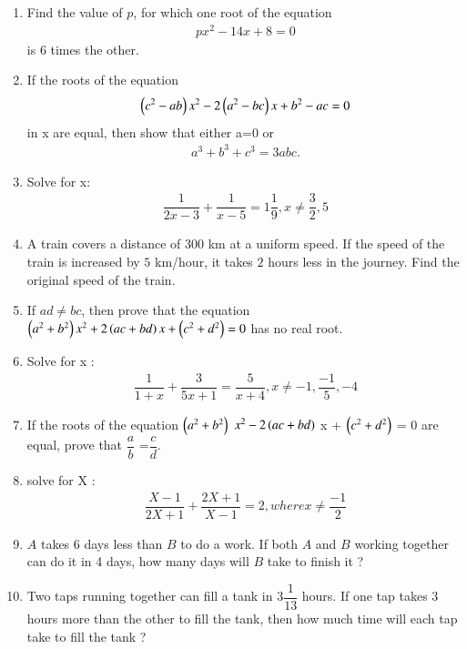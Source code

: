 \begin{enumerate}
\item Find the value of $p$, for which one root of the equation 
\begin{align*}
	px^2-14x+8=0
\end{align*}
is $6$ times the other.
\item If the roots of the equation
\begin{align*}
	\left(c^2-ab\right)x^2-2\left(a^2-bc\right)x+b^2-ac=0 
\end{align*}
in x are equal, then show that either a=0 or 
\begin{align*}
	a^3+b^3+c^3=3abc.
\end{align*}
\item Solve for x:
\begin{align*}
\dfrac{1}{2x-3}+\dfrac{1}{x-5}=1\dfrac{1}{9}, x\neq\dfrac{3}{2},5 
\end{align*}
\item A train covers a distance of $300$ km at a uniform speed. If the speed of the train is increased by $5$ km/hour, it takes $2$ hours less in the journey. Find the original speed of the  train.
\item If $ad \neq bc$, then prove that the equation $\left(a^2 + b^2\right)x^2 + 2\left(ac +bd\right)x + \left(c^2 + d^2\right) = 0 $ has no real root.
\item Solve for x :
 \begin{align*}
 \dfrac{1}{1+x} + \dfrac{3}{5x+1} = \dfrac{5}{x+4} , 
 x \neq -1, \dfrac{-1}{5}, -4
\end{align*}
\item If the roots of the equation $\left(a^2 + b^2\right)$ $x^{2} - 2\left(ac + bd\right)$ x + $\left(c^2 +d^2\right)$ = 0 are equal, prove that $\dfrac {a}  {b}$ =$\dfrac {c}  {d}$.

\item solve for X :
\begin{align*}
\dfrac{X-1}{2X+1}  +  \dfrac{2X+1}{X-1} =2 ,  where x  \neq  \dfrac{-1}{2}
\end{align*}
\item $A$ takes $6$ days less than $B$ to do a work. If both $A$ and $B$ working together can do it in 4 days, how many days will $B$ take to finish it ?
\item Two taps running together can fill a tank in $3\dfrac{1}{13}$ hours. If one tap takes $3$ hours more than the other to fill the tank, then how much time will each tap take to fill the tank ?
\end{enumerate}

